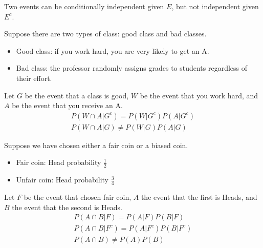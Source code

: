 \documentclass{beamer}
\begin{document}
\begin{frame}
    \begin{example}
        Two events can be conditionally independent given $E$, but not independent given $E^c$. 

        Suppose there are two types of class: good class and bad 
        classes.
        \begin{itemize}
            \item Good class: if you work hard, you are very likely to get an A.
            \item Bad class: the professor randomly assigns grades to students regardless of their effort.
        \end{itemize}
        Let $G$ be the event that a class is good, $W$ be the event that you work hard, and $A$ be the event that you receive an A.
        \[
        \begin{gathered}
            P(W\cap A|G^c) = P(W|G^c)P(A|G^c)\\
            P(W\cap A|G) \neq P(W|G)P(A|G)
        \end{gathered}
        \]
    \end{example}
\end{frame}

\begin{frame}
    \begin{example}
        Suppose we have chosen either a fair coin or a biased coin.
        \begin{itemize}
            \item Fair coin: Head probability $\frac{1}{2}$
            \item Unfair coin: Head probability $\frac{3}{4}$
        \end{itemize}
        Let $F$ be the event that chosen fair coin, $A$ the event that the first is Heads, and $B$ the event that the second is Heads.
        \[
        \begin{gathered}
            P(A\cap B|F) = P(A|F)P(B|F)\\
            P(A\cap B|F^c) = P(A|F^c)P(B|F^c)\\
            P(A\cap B) \neq P(A)P(B)
        \end{gathered}
        \]
    \end{example}
\end{frame}

\end{document}
